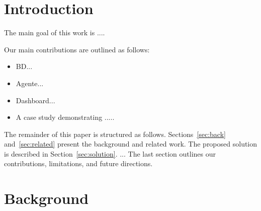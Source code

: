 \documentclass[sigconf,natbib=false]{acmart}
\begin{document}



\maketitle

\section{Introduction}



The main goal of this work is ....

Our main contributions are outlined as follows:
\begin{itemize}
  \item BD...
  \item Agente...
  \item Dashboard...
  \item A case study demonstrating .....
\end{itemize}  


The remainder of this paper is structured as follows. Sections~\ref{sec:back} and~\ref{sec:related} present the background and related work. The proposed solution is described in Section~\ref{sec:solution}. ... The last section outlines our contributions, limitations, and future directions.


\section{Background}
\end{document}
